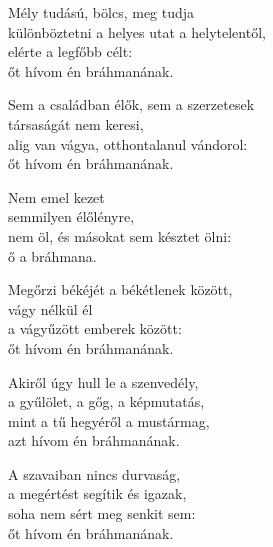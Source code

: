 \begin{dhpverse}

 Mély tudású, bölcs, meg tudja\\
különböztetni a helyes utat a helytelentől,\\
elérte a legfőbb célt:\\
őt hívom én bráhmanának.

 Sem a családban élők, sem a szerzetesek\\
társaságát nem keresi,\\
alig van vágya, otthontalanul vándorol:\\
őt hívom én bráhmanának.

 Nem emel kezet\\
semmilyen élőlényre,\\
nem öl, és másokat sem késztet ölni:\\
ő a bráhmana.

 Megőrzi békéjét a békétlenek között,\\
vágy nélkül él\\
a vágyűzött emberek között:\\
őt hívom én bráhmanának.

 Akiről úgy hull le a szenvedély,\\
a gyűlölet, a gőg, a képmutatás,\\
mint a tű hegyéről a mustármag,\\
azt hívom én bráhmanának.

 A szavaiban nincs durvaság,\\
a megértést segítik és igazak,\\
soha nem sért meg senkit sem:\\
őt hívom én bráhmanának.

\end{dhpverse}
\newpage
